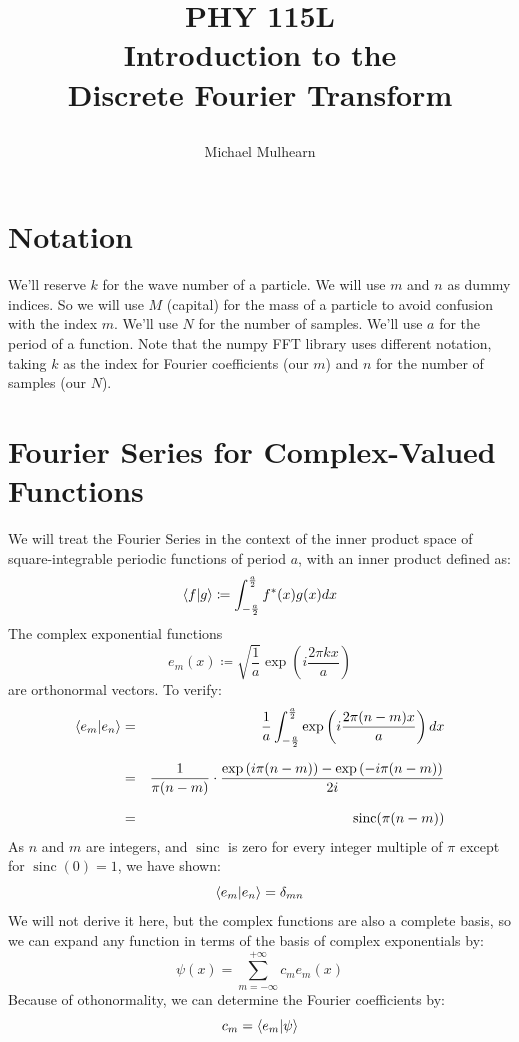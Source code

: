 \documentclass[12pt]{article}
\DeclareMathOperator{\sinc}{sinc}
\begin{document}
\title{PHY 115L \\
Introduction to the \\
Discrete Fourier Transform \\ 
\author{Michael Mulhearn}}

\maketitle

\section{Notation}

We'll reserve $k$ for the wave number of a particle.  We will use $m$
and $n$ as dummy indices.  So we will use $M$ (capital) for the mass
of a particle to avoid confusion with the index $m$.  We'll use $N$
for the number of samples.  We'll use $a$ for the period of a
function.  Note that the numpy FFT library uses different notation,
taking $k$ as the index for Fourier coefficients (our $m$) and $n$ for
the number of samples (our $N$).

\section{Fourier Series for Complex-Valued Functions}

We will treat the Fourier Series in the context of the inner product
space of square-integrable periodic functions of period $a$, with an
inner product defined as:
$$ \braket{f|g} \coloneqq \int_{-\frac{a}{2}}^{\frac{a}{2}} f^*(x) g(x) dx$$
The complex exponential functions
$$e_m(x) \coloneqq \sqrt{\frac{1}{a}} \exp\left(i \frac{2\pi k x}{a}\right)$$
are orthonormal vectors.  To verify:
\begin{eqnarray*}
  \braket{e_m|e_n} &=& \frac{1}{a} \int_{-\frac{a}{2}}^{\frac{a}{2}}
  \exp\left(i \frac{2\pi (n-m) x}{a}\right) dx \\[7pt]
  &=& \frac{1}{\pi (n-m)} \cdot \frac{\exp\left(i \pi (n-m) \right)-\exp\left(-i \pi (n-m) \right)}{2i}\\[7pt]
  &=& \sinc(\pi (n-m))
\end{eqnarray*}
As $n$ and $m$ are integers, and $\sinc$ is zero for every integer multiple of $\pi$ except for $\sinc(0)=1$, we have shown:
\begin{equation}
  \braket{e_m|e_n} = \delta_{mn}
\end{equation}
We will not derive it here, but the complex functions are also a complete basis, so we can expand any function in terms of the basis of complex exponentials by:
\begin{equation}
 \psi(x) = \sum_{m=-\infty}^{+\infty} c_m e_m (x)
\end{equation}
Because of othonormality, we can determine the Fourier coefficients by:
\begin{equation}
c_m = \braket{e_m | \psi}
\end{equation}
\end{document}
